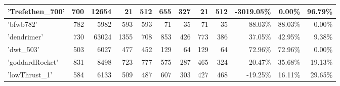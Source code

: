 \begin{table}[h]
{\begin{tabular}{|l|r|r|r|r|r|r|r|r|r|r|r|}
\hline
'Trefethen\_700'              & 700                                                     & 12654                                               & 21                      & 512                     & 655                     & 327                     & 21                      & 512                     & -3019.05\%                          & 0.00\%                             & 96.79\%                        \\ 
\hline
'bfwb782'                     & 782                                                     & 5982                                                & 593                     & 593                     & 71                      & 35                      & 71                      & 35                      & 88.03\%                             & 88.03\%                            & 0.00\%                         \\ 
\hline
'dendrimer'                   & 730                                                     & 63024                                               & 1355                    & 708                     & 853                     & 426                     & 773                     & 386                     & 37.05\%                             & 42.95\%                            & 9.38\%                         \\ 
\hline
'dwt\_503'                    & 503                                                     & 6027                                                & 477                     & 452                     & 129                     & 64                      & 129                     & 64                      & 72.96\%                             & 72.96\%                            & 0.00\%                         \\ 
\hline
'goddardRocket'     & 831                                                     & 8498                                                & 723                     & 777                     & 575                     & 287                     & 465                     & 324                     & 20.47\%                             & 35.68\%                            & 19.13\%                        \\ 
\hline
'lowThrust\_1'                & 584                                                     & 6133                                                & 509                     & 487                     & 607                     & 303                     & 427                     & 468                     & -19.25\%                            & 16.11\%                            & 29.65\%                        \\ 

\end{tabular}}
\end{table}
